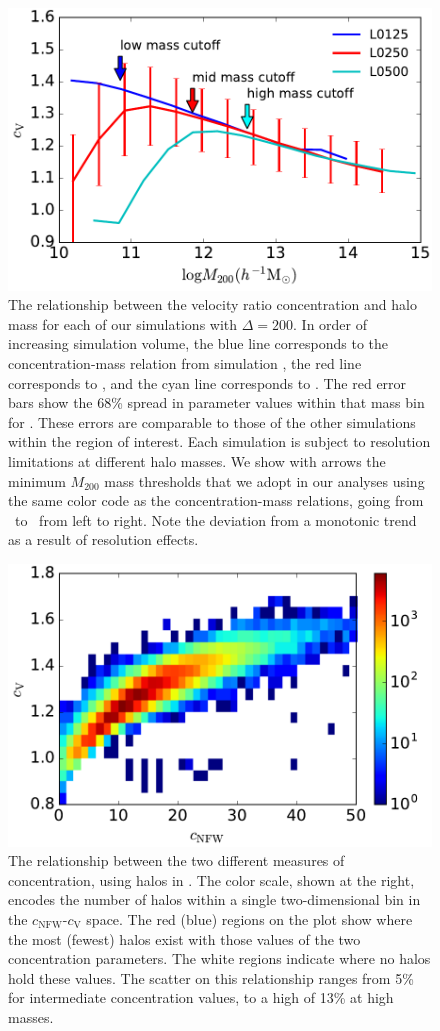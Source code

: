 \documentclass[usenatbib,fleqn]{mnras}
\begin{document}
\begin{figure}
\centering
\includegraphics[width=.5\textwidth]{masscut_cV_d200.pdf}
\caption{The relationship between the velocity ratio concentration and halo mass for each of our simulations with $\Delta =200$. 
In order of increasing simulation volume, the blue line corresponds to the concentration-mass relation from simulation 
\simA, the red line corresponds to \simB, and the cyan line corresponds to \simC. The red error bars show the 68\% spread in
parameter values within that mass bin for \simB. These errors are comparable to those of the other simulations
within the region of interest.
Each simulation is subject to resolution limitations at different halo masses. We show with arrows
the minimum $M_{200}$ mass thresholds that we adopt in our analyses using the same color code as 
the concentration-mass relations, going from \simA \ to \simC \ from left to right. Note the deviation from a monotonic trend as a result of resolution effects.
}
\label{fig:cvrelation}
\end{figure}

\begin{figure}
\centering
\includegraphics[width=.5\textwidth]{cvvscnfw_relation.pdf}
\caption{
The relationship between the two different measures of concentration, 
using halos in \simB. The color scale, shown at the right, encodes the number of halos 
within a single two-dimensional bin in the $c_{\mathrm{NFW}}$-$c_{\mathrm{V}}$ space. 
The red (blue) regions on the plot show where the most (fewest) halos exist with those values of the two
concentration parameters. The white regions indicate where no halos hold these values. The scatter on this relationship ranges from 5\% for intermediate concentration values, to a high of 13\% at high masses.
}
\label{fig:concentrations}
\end{figure}
\end{document}
